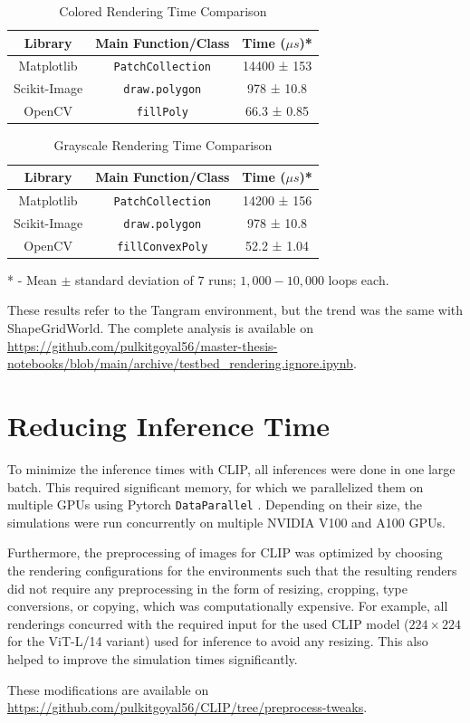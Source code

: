 \begin{table}[H]
    \centering
    \begin{tabular}[t]{@{} c c c @{}}
        \hline
        \textbf{Library} & \textbf{Main Function/Class} & \textbf{Time (\(\mu s\))*}\\
        \hline
        Matplotlib & \texttt{PatchCollection} & 14400 ± 153\\
        Scikit-Image & \texttt{draw.polygon} & 978 ± 10.8\\
        OpenCV & \texttt{fillPoly} & 66.3 ± 0.85\\
        \hline
    \end{tabular}
    \caption{Colored Rendering Time Comparison}
    \label{tab:render-time-color}
\end{table}
\begin{table}[H]
    \centering
    \begin{tabular}[t]{@{} c c c @{}}
        \hline
        \textbf{Library} & \textbf{Main Function/Class} & \textbf{Time (\(\mu s\))*}\\
        \hline
        Matplotlib & \texttt{PatchCollection} & 14200 ± 156\\
        Scikit-Image & \texttt{draw.polygon} & 978 ± 10.8\\
        OpenCV & \texttt{fillConvexPoly} & 52.2 ± 1.04\\
        \hline
    \end{tabular}
    \caption{Grayscale Rendering Time Comparison}
    \label{tab:render-time-bw}
\end{table}
* - Mean \(\pm\) standard deviation of \(7\) runs; \(1,000 - 10,000\) loops each.

These results refer to the Tangram environment, but the trend was the same with ShapeGridWorld.
The complete analysis is available on \url{https://github.com/pulkitgoyal56/master-thesis-notebooks/blob/main/archive/testbed_rendering.ignore.ipynb}.

\section{Reducing Inference Time}
\label{sec:improving-infer}
To minimize the inference times with CLIP, all inferences were done in one large batch.
This required significant memory, for which we parallelized them on multiple GPUs using Pytorch \texttt{DataParallel} \citep{pytorch}.
Depending on their size, the simulations were run concurrently on multiple NVIDIA V100 and A100 GPUs.

Furthermore, the preprocessing of images for CLIP was optimized by choosing the rendering configurations for the environments such that the resulting renders did not require any preprocessing in the form of resizing, cropping, type conversions, or copying, which was computationally expensive.
For example, all renderings concurred with the required input for the used CLIP model (\(224 \times 224\) for the ViT-L/14 variant) used for inference to avoid any resizing.
This also helped to improve the simulation times significantly.

These modifications are available on \url{https://github.com/pulkitgoyal56/CLIP/tree/preprocess-tweaks}.
